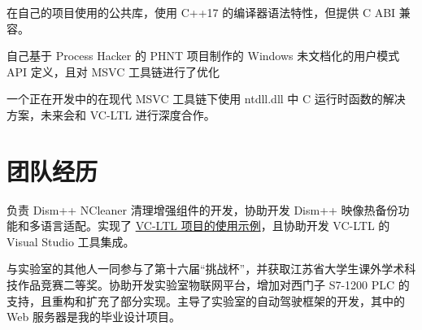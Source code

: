 \documentclass{resume}
\begin{document}
在自己的项目使用的公共库，使用 C++17 的编译器语法特性，但提供 C ABI 兼容。

自己基于 Process Hacker 的 PHNT 项目制作的 Windows 未文档化的用户模式 API 定义，且对 MSVC 工具链进行了优化

一个正在开发中的在现代 MSVC 工具链下使用 ntdll.dll 中 C 运行时函数的解决方案，未来会和 VC-LTL 进行深度合作。

\section{团队经历}

负责 Dism++ NCleaner 清理增强组件的开发，协助开发 Dism++ 映像热备份功能和多语言适配。实现了 \href{https://github.com/Chuyu-Team/vc-ltl-samples}{VC-LTL 项目的使用示例}，且协助开发 VC-LTL 的 Visual Studio 工具集成。

与实验室的其他人一同参与了第十六届“挑战杯”，并获取江苏省大学生课外学术科技作品竞赛二等奖。协助开发实验室物联网平台，增加对西门子 S7-1200 PLC 的支持，且重构和扩充了部分实现。主导了实验室的自动驾驶框架的开发，其中的 Web 服务器是我的毕业设计项目。
\end{document}
